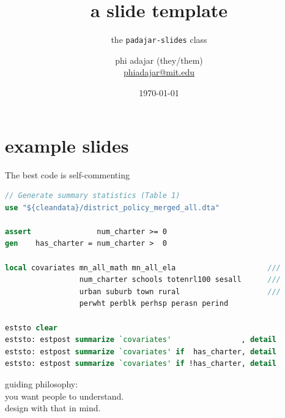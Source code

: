\documentclass[aspectratio=169, handout, sectionslides]{padajar-slides} %
\title{a slide template}
\subtitle{the \texttt{padajar-slides} class}
\date{\today}
\author{phi adajar (they/them) \\ \href{mailto:phiadajar@mit.edu}{phiadajar@mit.edu}}
\institute{v1.5.0}
\begin{document}
\maketitle


\section{example slides}

\begin{frame}[fragile]{The best code is self-commenting}
\begin{lstlisting}[language=Stata,
linebackgroundcolor={
	\btLstHL{1, 13}}
]
// Generate summary statistics (Table 1)
use "${cleandata}/district_policy_merged_all.dta"

assert               num_charter >= 0
gen    has_charter = num_charter >  0

local covariates mn_all_math mn_all_ela                   	///
                 num_charter schools totenrl100 sesall    	///
                 urban suburb town rural                  	///
                 perwht perblk perhsp perasn perind

eststo clear
eststo: estpost summarize `covariates'                , detail
eststo: estpost summarize `covariates' if  has_charter, detail
eststo: estpost summarize `covariates' if !has_charter, detail \end{lstlisting}
\end{frame}

\begin{frame}
	\raggedright
	guiding philosophy: \\
	you want people to \alert{understand}. \\
	design with that in mind.
\end{frame}
\end{document}
